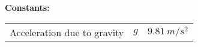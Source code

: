\documentclass[../TST.tex]{subfiles}
\begin{document}
\ifprob 
\vspace*{2ex}
\textbf{Constants:}\\[5pt]
\begin{tabular}{@{}lll@{}}
Acceleration due to gravity & $g$ & $\qty{9.81}{m/s^2}$ \\
\end{tabular}

\else
\fi
\end{document}
